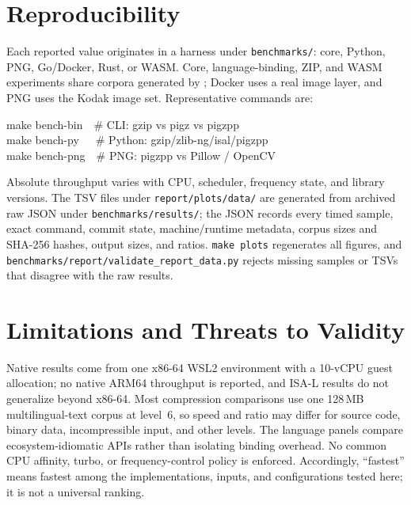 \documentclass{pigzpp-whitepaper}
\begin{document}
\section{Reproducibility}
Each reported value originates in a harness under \texttt{benchmarks/}: core,
Python, PNG, Go/Docker, Rust, or WASM. Core, language-binding, ZIP, and WASM
experiments share corpora generated by ;
Docker uses a real image layer, and PNG uses the Kodak image set. Representative
commands are:

\begin{center}
\begin{minipage}{0.96\columnwidth}
\ttfamily\scriptsize\color{ink}
make bench-bin\ \ \# CLI: gzip vs pigz vs pigzpp\\
make bench-py\ \ \ \# Python: gzip/zlib-ng/isal/pigzpp\\
make bench-png\ \ \# PNG: pigzpp vs Pillow / OpenCV
\end{minipage}
\end{center}
\noindent Absolute throughput varies with CPU, scheduler, frequency state, and
library versions. The TSV files under \texttt{report/plots/data/} are generated
from archived raw JSON under \texttt{benchmarks/results/}; the JSON records every
timed sample, exact command, commit state, machine/runtime metadata, corpus sizes
and SHA-256 hashes, output sizes, and ratios. \texttt{make plots} regenerates all
figures, and \texttt{benchmarks/report/validate\_report\_data.py} rejects missing
samples or TSVs that disagree with the raw results.

\section{Limitations and Threats to Validity}
Native results come from one x86-64 WSL2 environment with a 10-vCPU guest
allocation; no native ARM64 throughput is reported, and ISA-L results do not
generalize beyond x86-64. Most compression
comparisons use one 128\,MB multilingual-text corpus at level~6, so speed and
ratio may differ for source code, binary data, incompressible input, and other
levels. The language panels compare ecosystem-idiomatic APIs rather than
isolating binding overhead. No common CPU affinity, turbo, or frequency-control
policy is enforced. Accordingly, ``fastest'' means fastest
among the implementations, inputs, and configurations tested here; it is not a
universal ranking.
\end{document}
